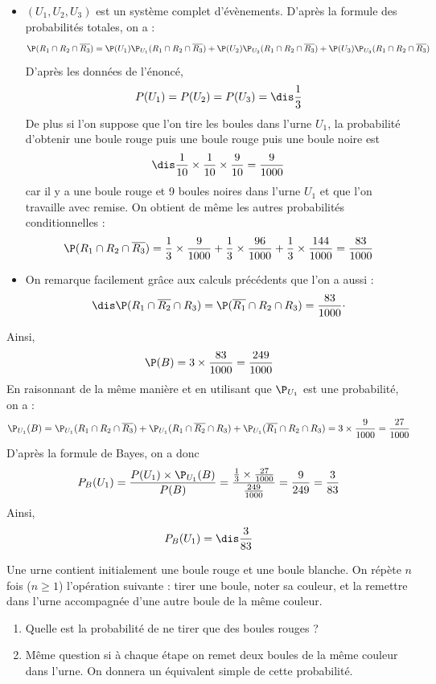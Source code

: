 \documentclass[a4paper,10pt]{report}
\begin{document}
\begin{itemize}
\item $(U_1,U_2,U_3)$ est un système complet d'évènements. D'après la formule des probabilités totales, on a : 
\[ \P( R_1 \cap R_2 \cap \overline{R_3}) = \P(U_1) \P_{U_1}( R_1 \cap R_2 \cap \overline{R_3}) + \P(U_2) \P_{U_2}( R_1 \cap R_2 \cap \overline{R_3}) + \P(U_3) \P_{U_3}( R_1 \cap R_2 \cap \overline{R_3}) \]
D'après les données de l'énoncé, 
$$P(U_1)= P(U_2)= P(U_3)= \dis \frac{1}{3}$$
De plus si l'on suppose que l'on tire les boules dans l'urne $U_1$, la probabilité d'obtenir une boule rouge puis une boule rouge puis une boule noire est 
$$\dis \frac{1}{10} \times \frac{1}{10} \times \frac{9}{10} = \frac{9}{1000}$$ car il y a une boule rouge et 9 boules noires dans l'urne $U_1$ et que l'on travaille avec remise. On obtient de même les autres probabilités conditionnelles :
\[ \P( R_1 \cap R_2 \cap \overline{R_3}) = \frac{1}{3} \times \frac{9}{1000} + \frac{1}{3} \times \frac{96}{1000} + \frac{1}{3} \times \frac{144}{1000} = \frac{83}{1000} \]
\item On remarque facilement grâce aux calculs précédents que l'on a aussi :
$$\dis \P(R_1 \cap \overline{R_2} \cap R_3) = \P(\overline{R_1} \cap R_2 \cap R_3) = \frac{83}{1000} \cdot$$
\end{itemize}
Ainsi, 
$$ \P(B) = 3 \times \frac{83}{1000} = \frac{249}{1000}$$
En raisonnant de la même manière et en utilisant que $\P_{U_1}$ est une probabilité, on a :
\[ \P_{U_1}(B) =  \P_{U_1}(R_1 \cap R_2 \cap \overline{R_3}) + \P_{U_1}(R_1 \cap \overline{R_2} \cap R_3) + \P_{U_1} (\overline{R_1} \cap R_2 \cap R_3) = 3 \times \frac{9}{1000} = \frac{27}{1000} \]
D'après la formule de Bayes, on a donc 
\[ P_{B}(U_1) = \frac{P(U_1) \times \P_{U_1}(B) }{P(B)} = \frac{\frac{1}{3} \times \frac{27}{1000}}{\frac{249}{1000}} = \frac{9}{249} = \frac{3}{83} \]
Ainsi,
$$ P_{B}(U_1) = \dis \frac{3}{83} $$

\begin{Exercice}{} Une urne contient initialement une boule rouge et une boule blanche. On répète $n$ fois ($n \geq 1$) l'opération suivante : tirer une boule, noter sa couleur, et la remettre dans l'urne accompagnée d'une autre boule de la même couleur. 

\begin{enumerate}
\item Quelle est la probabilité de ne tirer que des boules rouges ?
\item Même question si à chaque étape on remet deux boules de la même couleur dans l'urne. On donnera un équivalent simple de cette probabilité.
\end{enumerate}
\end{Exercice} 
\end{document}
